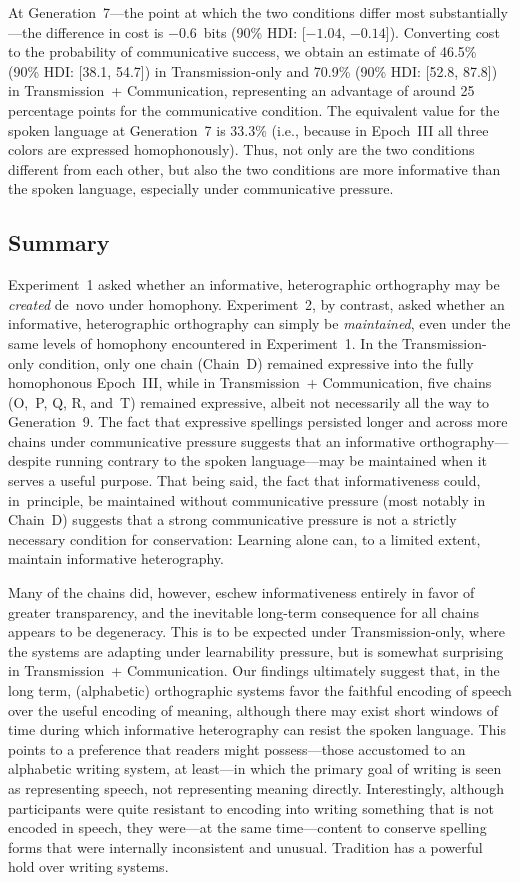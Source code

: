 \documentclass[doc,biblatex]{apa7}
\begin{document}
At Generation~7---the point at which the two conditions differ most substantially---the difference in cost is $-0.6$~bits (90\% HDI: [$-1.04$, $-0.14$]). Converting cost to the probability of communicative success, we obtain an estimate of 46.5\% (90\% HDI: [38.1, 54.7]) in Transmission-only and 70.9\% (90\% HDI: [52.8, 87.8]) in Transmission~+ Communication, representing an advantage of around 25 percentage points for the communicative condition. The equivalent value for the spoken language at Generation~7 is 33.3\% (i.e., because in Epoch~III all three colors are expressed homophonously). Thus, not only are the two conditions different from each other, but also the two conditions are more informative than the spoken language, especially under communicative pressure.

\subsection{Summary}

Experiment~1 asked whether an informative, heterographic orthography may be \textit{created} de~novo under homophony. Experiment~2, by contrast, asked whether an informative, heterographic orthography can simply be \textit{maintained}, even under the same levels of homophony encountered in Experiment~1. In the Transmission-only condition, only one chain (Chain~D) remained expressive into the fully homophonous Epoch~III, while in Transmission~+ Communication, five chains (O,~P, Q, R, and~T) remained expressive, albeit not necessarily all the way to Generation~9. The fact that expressive spellings persisted longer and across more chains under communicative pressure suggests that an informative orthography---despite running contrary to the spoken language---may be maintained when it serves a useful purpose. That being said, the fact that informativeness could, in~principle, be maintained without communicative pressure (most notably in Chain~D) suggests that a strong communicative pressure is not a strictly necessary condition for conservation: Learning alone can, to a limited extent, maintain informative heterography.

Many of the chains did, however, eschew informativeness entirely in favor of greater transparency, and the inevitable long-term consequence for all chains appears to be degeneracy. This is to be expected under Transmission-only, where the systems are adapting under learnability pressure, but is somewhat surprising in Transmission~+ Communication. Our findings ultimately suggest that, in the long term, (alphabetic) orthographic systems favor the faithful encoding of speech over the useful encoding of meaning, although there may exist short windows of time during which informative heterography can resist the spoken language. This points to a preference that readers might possess---those accustomed to an alphabetic writing system, at least---in which the primary goal of writing is seen as representing speech, not representing meaning directly. Interestingly, although participants were quite resistant to encoding into writing something that is not encoded in speech, they were---at the same time---content to conserve spelling forms that were internally inconsistent and unusual. Tradition has a powerful hold over writing systems.
\end{document}

